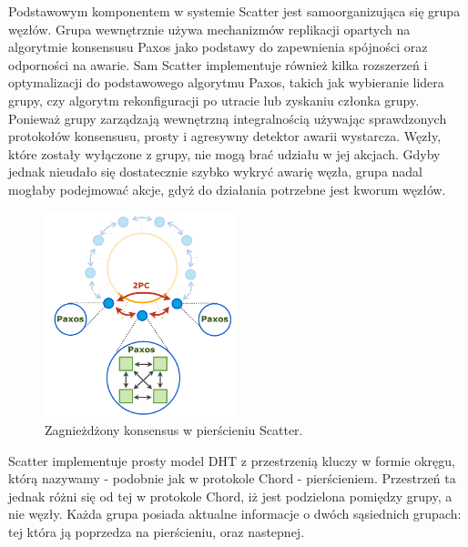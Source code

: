 \documentclass[12pt, twoside, openany]{report}
\begin{document}
Podstawowym komponentem w systemie Scatter jest samoorganizująca się grupa węzłów. Grupa wewnętrznie używa mechanizmów replikacji opartych na algorytmie konsensusu Paxos jako podstawy do zapewnienia spójności oraz odporności na awarie. Sam Scatter implementuje również kilka rozszerzeń i optymalizacji do podstawowego algorytmu Paxos, takich jak wybieranie lidera grupy, czy algorytm rekonfiguracji po utracie lub zyskaniu członka grupy.
Ponieważ grupy zarządzają wewnętrzną integralnością używając sprawdzonych protokołów konsensusu, prosty i agresywny detektor awarii wystarcza. Węzły, które zostały wyłączone z grupy, nie mogą brać udziału w jej akcjach. Gdyby jednak nieudało się dostatecznie szybko wykryć awarię węzła, grupa nadal mogłaby podejmować akcje, gdyż do działania potrzebne jest kworum węzłów.

\begin{figure}[H]
\centering
\includegraphics[width=0.5\textwidth,height=\textheight,keepaspectratio]{scatter.png}
\caption{Zagnieżdżony konsensus w pierścieniu Scatter.}
\label{fig:scatter}
\end{figure}

Scatter implementuje prosty model DHT z przestrzenią kluczy w formie okręgu, którą nazywamy - podobnie jak w protokole Chord - pierścieniem. Przestrzeń ta jednak różni się od tej w protokole Chord, iż jest podzielona pomiędzy grupy, a nie węzły. Każda grupa posiada aktualne informacje o dwóch sąsiednich grupach: tej która ją poprzedza na pierścieniu, oraz nastepnej.
\end{document}
